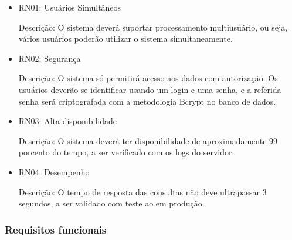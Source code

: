 \begin{itemize}
	
	
\item RN01: Usuários Simultâneos


Descrição: O sistema deverá suportar processamento multiusuário, ou seja, vários usuários poderão utilizar o sistema simultaneamente. 


\item RN02: Segurança 


Descrição: O sistema só permitirá acesso aos dados com autorização. Os usuários deverão se identificar usando um login e uma senha, e a referida senha será criptografada com a metodologia Bcrypt no banco de dados.


\item RN03: Alta disponibilidade 


Descrição: O sistema deverá ter disponibilidade de aproximadamente 99 porcento do tempo, a ser verificado com os logs do servidor.


\item RN04: Desempenho


Descrição: O tempo de resposta das consultas não deve ultrapassar 3 segundos, a ser validado com teste ao em produção.


\end{itemize}
	

\subsubsection{Requisitos funcionais}


